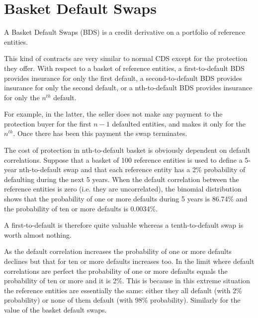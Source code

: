 %
%

\section{Basket Default Swaps}
\label{basket-default-swaps}

A Basket Default Swaps (BDS) is a credit derivative on a portfolio of reference entities.

This kind of contracts are very similar to normal CDS except for the protection they offer. With respect to a basket of reference entities, a first-to-default BDS provides insurance for only the first default, a second-to-default BDS provides insurance for only the second default, or a nth-to-default BDS provides insurance for only the $n^{th}$ default. 

For example, in the latter, the seller does not make any payment to the protection buyer for the first $n-1$ defaulted entities, and makes it only for the $n^{th}$. Once there has been this payment the swap terminates.

The cost of protection in nth-to-default basket is obviously dependent on default correlations. Suppose that a basket of 100 reference entities is used to define a 5-year nth-to-default swap and that each reference entity has a 2\% probability of defaulting during the next 5 years. When the default correlation between the reference entities is zero (i.e. they are uncorrelated), the binomial distribution shows that the probability of one or more defaults during 5 years is 86.74\% and the probability of ten or more defaults is 0.0034\%.

A first-to-default is therefore quite valuable whereas a tenth-to-default swap is worth almost nothing.

As the default correlation increases the probability of one or more defaults declines but that for ten or more defaults increases too. In the limit where default correlations are perfect the probability of one or more defaults equals the probability of ten or more and it is 2\%. This is because in this extreme situation the reference entities are essentially the same: either they all default (with 2\% probability) or none of them default (with 98\% probability). Similarly for the value of the basket default swaps.

